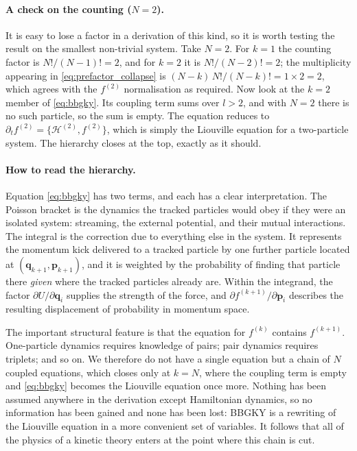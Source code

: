 \documentclass[12pt]{article}
\renewcommand{\vec}[1]{\bm{#1}}
\begin{document}
\paragraph{A check on the counting ($N=2$).}  It is easy to lose a
factor in a derivation of this kind, so it is worth testing the result
on the smallest non-trivial system.  Take $N=2$.  For $k=1$ the
counting factor is $N!/(N-1)! = 2$, and for $k=2$ it is
$N!/(N-2)! = 2$; the multiplicity appearing in
\eqref{eq:prefactor_collapse} is $(N-k)\,N!/(N-k)! = 1\times 2 = 2$,
which agrees with the $f^{(2)}$ normalisation as required.  Now look at
the $k=2$ member of \eqref{eq:bbgky}.  Its coupling term sums over
$l>2$, and with $N=2$ there is no such particle, so the sum is empty.
The equation reduces to
$\partial_t f^{(2)} = \{\mathcal H^{(2)},f^{(2)}\}$, which is simply
the Liouville equation for a two-particle system.  The hierarchy closes
at the top, exactly as it should.

\paragraph{How to read the hierarchy.}  Equation \eqref{eq:bbgky} has
two terms, and each has a clear interpretation.  The Poisson bracket is
the dynamics the tracked particles would obey if they were an isolated
system: streaming, the external potential, and their mutual
interactions.  The integral is the correction due to everything else in
the system.  It represents the momentum kick delivered to a tracked
particle by one further particle located at
$(\vec q_{k+1},\vec p_{k+1})$, and it is weighted by the probability of
finding that particle there \emph{given} where the tracked particles
already are.  Within the integrand, the factor
$\partial U/\partial\vec q_i$ supplies the strength of the force, and
$\partial f^{(k+1)}/\partial\vec p_i$ describes the resulting
displacement of probability in momentum space.

The important structural feature is that the equation for $f^{(k)}$
contains $f^{(k+1)}$.  One-particle dynamics requires knowledge of
pairs; pair dynamics requires triplets; and so on.  We therefore do not
have a single equation but a chain of $N$ coupled equations, which
closes only at $k=N$, where the coupling term is empty and
\eqref{eq:bbgky} becomes the Liouville equation once more.  Nothing has
been assumed anywhere in the derivation except Hamiltonian dynamics, so
no information has been gained and none has been lost: BBGKY is a
rewriting of the Liouville equation in a more convenient set of
variables.  It follows that all of the physics of a kinetic theory
enters at the point where this chain is cut.
\end{document}
